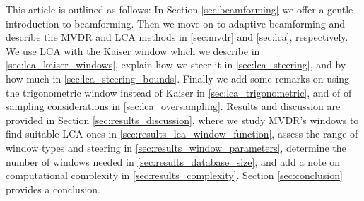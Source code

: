 \documentclass[10pt,journal,draftclsnofoot,onecolumn]{IEEEtran}
\newcommand\1{\vec 1}
\begin{document}
This article is outlined as follows: In Section \ref{sec:beamforming} we offer a gentle introduction to beamforming. Then we move on to adaptive beamforming and describe the MVDR and LCA methods in \ref{sec:mvdr} and \ref{sec:lca}, respectively. We use LCA with the Kaiser window which we describe in \ref{sec:lca_kaiser_windows}, explain how we steer it in \ref{sec:lca_steering}, and by how much in \ref{sec:lca_steering_bounds}. Finally we add some remarks on using the trigonometric window instead of Kaiser in \ref{sec:lca_trigonometric}, and of of sampling considerations in \ref{sec:lca_oversampling}. Results and discussion are provided in Section \ref{sec:results_discussion}, where we study MVDR's windows to find suitable LCA ones in \ref{sec:results_lca_window_function}, assess the range of window types and steering in \ref{sec:results_window_parameters}, determine the number of windows needed in \ref{sec:results_database_size}, and add a note on computational complexity in \ref{sec:results_complexity}. Section \ref{sec:conclusion} provides a conclusion.


% 
% 
% 
% 
% 
% 
\end{document}
